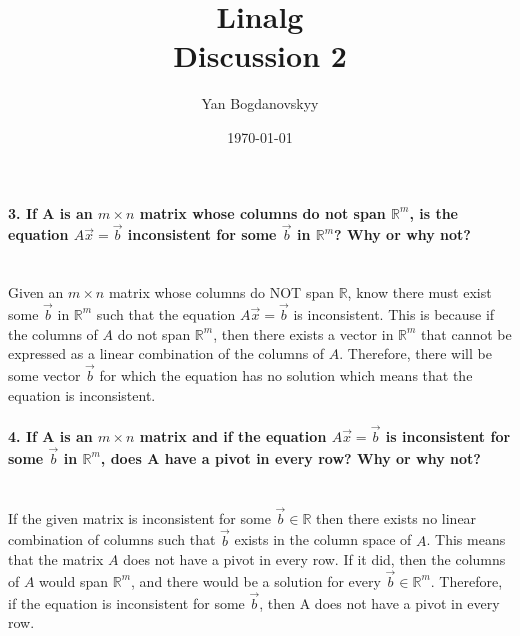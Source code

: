\documentclass{report}
\title{\Huge{Linalg}\\ Discussion 2}
\author{\huge{Yan Bogdanovskyy}}
\date{\today}
\begin{document}
\maketitle
\newpage%

\paragraph{3. If A is an $ m\times n  $ matrix whose columns do not span $ \mathbb{R}^{ m } $, is the equation $ A \vec{ x }= \vec{ b } $ inconsistent for some $ \vec{ b } $ in $ \mathbb{R}^{ m } $? Why or why not? \\ \\}
Given an $ m \times n $ matrix whose columns do NOT span $\mathbb{R} $, know there must exist some $ \vec{ b} $ in $ \mathbb{R}^{ m } $ such that the equation $ A \vec{ x } = \vec{ b } $ is inconsistent. This is because if the columns of $ A $ do not span $ \mathbb{R}^{ m } $, then there exists a vector in $ \mathbb{R}^{ m } $ that cannot be expressed as a linear combination of the columns of $ A $. Therefore, there will be some vector $ \vec{ b} $ for which the equation has no solution which means that the equation is inconsistent.
\paragraph{4. If A is an $ m \times n $ matrix and if the equation $ A \vec{ x } = \vec{ b } $ is inconsistent for some $ \vec{ b } $ in $ \mathbb{R}^{ m } $, does A have a pivot in every row? Why or why not? \\ \\}
If the given matrix is inconsistent for some $ \vec{ b } \in \mathbb{R}$ then there exists no linear combination of columns such that $ \vec{ b } $ exists in the column space of $ A $. This means that the matrix $ A $ does not have a pivot in every row. If it did, then the columns of $ A $ would span $ \mathbb{R}^{ m } $, and there would be a solution for every $ \vec{ b} \in \mathbb{R}^{ m }$. Therefore, if the equation is inconsistent for some $ \vec{ b} $, then A does not have a pivot in every row.
\end{document}
